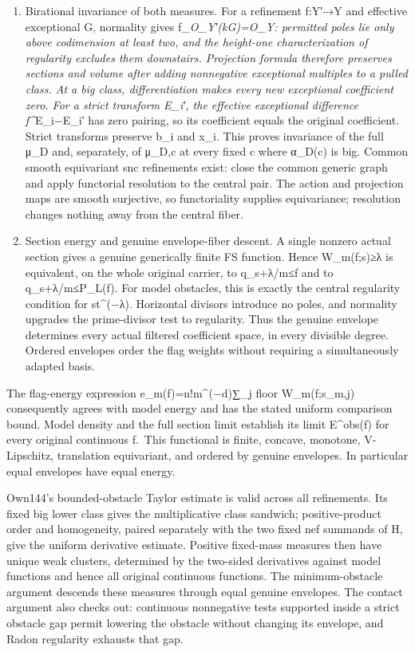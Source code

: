 \documentclass[
  10pt,
]{article}
\begin{document}
\begin{enumerate}
\def\labelenumi{\arabic{enumi}.}
\setcounter{enumi}{3}
\item
  Birational invariance of both measures. For a refinement f:Y′→Y and
  effective exceptional G, normality gives f\_\emph{O\_Y′(kG)=O\_Y:
  permitted poles lie only above codimension at least two, and the
  height-one characterization of regularity excludes them downstairs.
  Projection formula therefore preserves sections and volume after
  adding nonnegative exceptional multiples to a pulled class. At a big
  class, differentiation makes every new exceptional coefficient zero.
  For a strict transform E\_i′, the effective exceptional difference
  f\^{}}E\_i−E\_i′ has zero pairing, so its coefficient equals the
  original coefficient. Strict transforms preserve b\_i and x\_i. This
  proves invariance of the full μ\_D and, separately, of μ\_D,c at every
  fixed c where α\_D(c) is big. Common smooth equivariant snc
  refinements exist: close the common generic graph and apply functorial
  resolution to the central pair. The action and projection maps are
  smooth surjective, so functoriality supplies equivariance; resolution
  changes nothing away from the central fiber.
\item
  Section energy and genuine envelope-fiber descent. A single nonzero
  actual section gives a genuine generically finite FS function. Hence
  W\_m(f;s)≥λ is equivalent, on the whole original carrier, to
  q\_s+λ/m≤f and to q\_s+λ/m≤P\_L(f). For model obstacles, this is
  exactly the central regularity condition for st\^{}(−λ). Horizontal
  divisors introduce no poles, and normality upgrades the prime-divisor
  test to regularity. Thus the genuine envelope determines every actual
  filtered coefficient space, in every divisible degree. Ordered
  envelopes order the flag weights without requiring a simultaneously
  adapted basis.
\end{enumerate}

The flag-energy expression e\_m(f)=n!m\^{}(−d)∑\_j floor W\_m(f;s\_m,j)
consequently agrees with model energy and has the stated uniform
comparison bound. Model density and the full section limit establish its
limit E\^{}obs(f) for every original continuous f.~This functional is
finite, concave, monotone, V-Lipschitz, translation equivariant, and
ordered by genuine envelopes. In particular equal envelopes have equal
energy.

Own144's bounded-obstacle Taylor estimate is valid across all
refinements. Its fixed big lower class gives the multiplicative class
sandwich; positive-product order and homogeneity, paired separately with
the two fixed nef summands of H, give the uniform derivative estimate.
Positive fixed-mass measures then have unique weak clusters, determined
by the two-sided derivatives against model functions and hence all
original continuous functions. The minimum-obstacle argument descends
these measures through equal genuine envelopes. The contact argument
also checks out: continuous nonnegative tests supported inside a strict
obstacle gap permit lowering the obstacle without changing its envelope,
and Radon regularity exhausts that gap.
\end{document}
